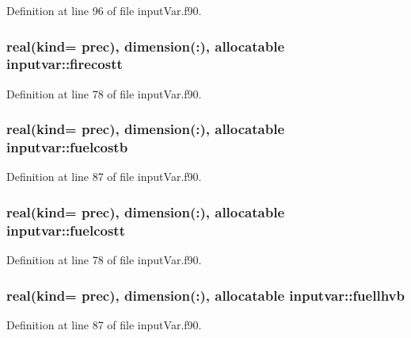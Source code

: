 Definition at line 96 of file input\-Var.\-f90.

\hypertarget{classinputvar_a57526f25accbe0af7902997bd9cde614}{
\subsubsection[{firecostt}]{\setlength{\rightskip}{0pt plus 5cm}real(kind= prec), dimension(\-:), allocatable inputvar\-::firecostt}}\label{classinputvar_a57526f25accbe0af7902997bd9cde614}


Definition at line 78 of file input\-Var.\-f90.

\hypertarget{classinputvar_a7ba5eba73efe4e693920d6af7782e58e}{
\subsubsection[{fuelcostb}]{\setlength{\rightskip}{0pt plus 5cm}real(kind= prec), dimension(\-:), allocatable inputvar\-::fuelcostb}}\label{classinputvar_a7ba5eba73efe4e693920d6af7782e58e}


Definition at line 87 of file input\-Var.\-f90.

\hypertarget{classinputvar_a85ccff6d868e650d2255bb9faa7c31be}{
\subsubsection[{fuelcostt}]{\setlength{\rightskip}{0pt plus 5cm}real(kind= prec), dimension(\-:), allocatable inputvar\-::fuelcostt}}\label{classinputvar_a85ccff6d868e650d2255bb9faa7c31be}


Definition at line 78 of file input\-Var.\-f90.

\hypertarget{classinputvar_a3cd62c9288fded8bd8de8066cbb3ca20}{
\subsubsection[{fuellhvb}]{\setlength{\rightskip}{0pt plus 5cm}real(kind= prec), dimension(\-:), allocatable inputvar\-::fuellhvb}}\label{classinputvar_a3cd62c9288fded8bd8de8066cbb3ca20}


Definition at line 87 of file input\-Var.\-f90.

